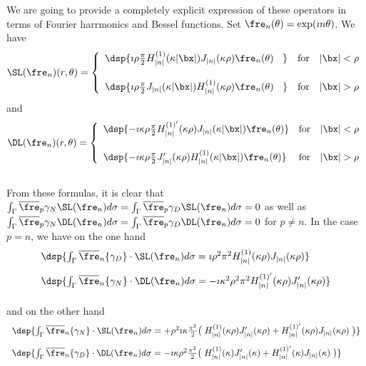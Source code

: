 \documentclass[a4paper,11pt]{article}
\begin{document}
We are going to provide a completely explicit expression of these operators in terms
of Fourier harrmonics and Bessel functions. Set $\fre_{n}(\theta) = \exp(\imath n\theta)$.
We have
$$
\SL(\fre_{n})(r,\theta) =
\left\{\begin{array}{ll}
\dsp{\imath\rho\frac{\pi}{2}H^{(1)}_{\vert n\vert}(\kappa \vert \bx \vert )J_{\vert n\vert}(\kappa \rho)\fre_{n}(\theta)\phantom{\imath\kappa} } & \textrm{for}\quad \vert \bx\vert< \rho\\[15pt]
\dsp{\imath\rho\frac{\pi}{2}J_{\vert n\vert}(\kappa \vert \bx \vert )H^{(1)}_{\vert n\vert}(\kappa \rho)\fre_{n}(\theta)\phantom{\imath\kappa} } & \textrm{for}\quad \vert \bx\vert>\rho
\end{array}\right.
$$
and
$$
\DL(\fre_{n})(r,\theta) =
\left\{\begin{array}{ll}
\dsp{ -\imath\kappa \rho\frac{\pi}{2}H^{(1)'}_{\vert n\vert}(\kappa \rho)J_{\vert n\vert}(\kappa \vert \bx \vert )\fre_{n}(\theta) } & \textrm{for}\quad \vert \bx\vert< \rho\\[15pt]
\dsp{ -\imath\kappa \rho \frac{\pi}{2}J_{\vert n\vert}'(\kappa \rho )H^{(1)}_{\vert n\vert}(\kappa \vert \bx \vert)\fre_{n}(\theta) } & \textrm{for}\quad \vert \bx\vert>\rho
\end{array}\right.
$$
\quad\\[5pt]
From these formulas, it is  clear that $\int_{\Gamma}\overline{\fre}_{p}\gamma_{N}\SL(\fre_{n}) d\sigma = \int_{\Gamma}\overline{\fre}_{p}\gamma_{D}\SL(\fre_{n}) d\sigma = 0$
as well as $\int_{\Gamma}\overline{\fre}_{p}\gamma_{N}\DL(\fre_{n}) d\sigma = \int_{\Gamma}\overline{\fre}_{p}\gamma_{D}\DL(\fre_{n}) d\sigma = 0$ for $p\neq n$. In the
case $p=n$, we have on the one hand
$$
\begin{array}{l}
\dsp{ \int_{\Gamma}\overline{\fre}_{n}\{\gamma_{D}\}\cdot\SL(\fre_{n}) d\sigma = \imath \rho^2 \pi^{2} H^{(1)}_{\vert n\vert}(\kappa \rho ) J_{\vert n\vert}(\kappa \rho) }\\[10pt]
\dsp{ \int_{\Gamma}\overline{\fre}_{n}\{\gamma_{N}\}\cdot\DL(\fre_{n}) d\sigma = -\imath \kappa^{2} \rho^2 \pi^{2} H^{(1)'}_{\vert n\vert}(\kappa \rho) J_{\vert n\vert}'(\kappa \rho) }\\[10pt]
\end{array}
$$
and on the other hand
$$
\begin{array}{l}
\dsp{ \int_{\Gamma}\overline{\fre}_{n}\{\gamma_{N}\}\cdot\SL(\fre_{n}) d\sigma = +\rho^2 \imath\kappa\frac{\pi^{2}}{2}
\big(\; H^{(1)}_{\vert n\vert}(\kappa \rho )J_{\vert n\vert}'(\kappa \rho )+H^{(1)'}_{\vert n\vert}(\kappa \rho )J_{\vert n\vert}(\kappa \rho)\; \big) }\\[10pt]
\dsp{ \int_{\Gamma}\overline{\fre}_{n}\{\gamma_{D}\}\cdot\DL(\fre_{n}) d\sigma = -\imath\kappa \rho^2 \frac{\pi^{2}}{2}
\big(\; H^{(1)}_{\vert n\vert}(\kappa)J_{\vert n\vert}'(\kappa)+H^{(1)'}_{\vert n\vert}(\kappa)J_{\vert n\vert}(\kappa)\; \big) }\\[10pt]
\end{array}
$$
\end{document}
